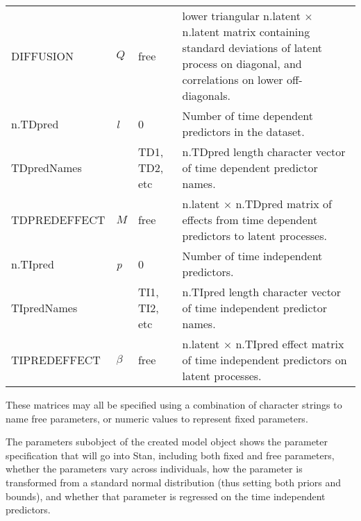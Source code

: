 \documentclass[nojss]{jss}\usepackage[]{graphicx}\usepackage[]{color}
\begin{document}
\begin{table}
\begin{tabular}{l|l|l p{8cm} }
 DIFFUSION & $Q$ & free & lower triangular n.latent $\times$ n.latent matrix containing standard deviations of latent process on diagonal, and correlations on lower off-diagonals.\\
 n.TDpred & \textit{l} & 0 & Number of time dependent predictors in the dataset.\\
 TDpredNames & & TD1, TD2, etc & n.TDpred length character vector of time dependent predictor names.\\
 TDPREDEFFECT & $M$ & free & n.latent $\times$ n.TDpred matrix of effects from time dependent predictors to latent processes.\\
 n.TIpred & \textit{p} & 0 & Number of time independent predictors.\\
 TIpredNames & & TI1, TI2, etc & n.TIpred length character vector of time independent predictor names.\\
 TIPREDEFFECT & $\beta$ & free & n.latent $\times$ n.TIpred effect matrix of time independent predictors on latent processes.\\
\end{tabular}
\end{table}

These matrices may all be specified using a combination of character strings to name free parameters, or numeric values to represent fixed parameters. 

The parameters subobject of the created model object shows the parameter specification that will go into Stan, including both fixed and free parameters, whether the parameters vary across individuals, how the parameter is transformed from a standard normal distribution (thus setting both priors and bounds), and whether that parameter is regressed on the time independent predictors.
\end{document}
